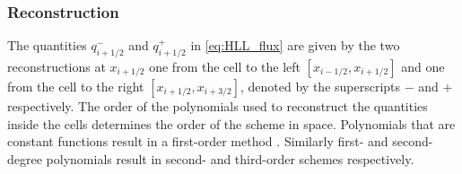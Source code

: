 \documentclass[SingleSpace,12pt]{Serre_ASCE}
\begin{document}
\subsubsection{Reconstruction} %
The quantities $q^-_{i + 1/2}$ and $q^+_{i + 1/2}$ in \eqref{eq:HLL_flux} are given by the two reconstructions at $x_{i + 1/2}$ one from the cell to the left $[x_{i - 1/2}, x_{i+ 1/2}]$ and one from the cell to the right $[x_{i + 1/2}, x_{i+ 3/2}]$, denoted by the superscripts $-$ and $+$ respectively. The order of the polynomials used to reconstruct the quantities inside the cells determines the order of the scheme in space. Polynomials that are constant functions result in a first-order method \cite{Godunov-1959-271}. Similarly first- and second-degree polynomials result in second- and third-order schemes respectively. 
\end{document}
